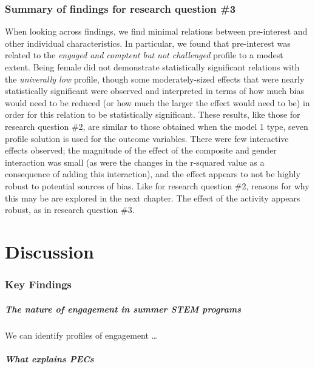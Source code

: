 \documentclass[]{book}
\let\oldparagraph\paragraph
\renewcommand{\paragraph}[1]{\oldparagraph{#1}\mbox{}}
\theoremstyle{definition}
\theoremstyle{definition}
\theoremstyle{definition}
\theoremstyle{remark}
\begin{document}
\subsection{Summary of findings for research question
\#3}\label{summary-of-findings-for-research-question-3}

When looking across findings, we find minimal relations between
pre-interest and other individual characteristics. In particular, we
found that pre-interest was related to the \emph{engaged and comptent
but not challenged} profile to a modest extent. Being female did not
demonstrate statistically significant relations with the
\emph{univerally low} profile, though some moderately-sized effects that
were nearly statistically significant were observed and interpreted in
terms of how much bias would need to be reduced (or how much the larger
the effect would need to be) in order for this relation to be
statistically significant. These results, like those for research
question \#2, are similar to those obtained when the model 1 type, seven
profile solution is used for the outcome variables. There were few
interactive effects observed; the magnitude of the effect of the
composite and gender interaction was small (as were the changes in the
r-squared value as a consequence of adding this interaction), and the
effect appears to not be highly robust to potential sources of bias.
Like for research question \#2, reasons for why this may be are explored
in the next chapter. The effect of the activity appears robust, as in
research question \#3.

\chapter{Discussion}\label{discussion}

\subsection{Key Findings}\label{key-findings}

\paragraph{The nature of engagement in summer STEM
programs}\label{the-nature-of-engagement-in-summer-stem-programs}

We can identify profiles of engagement \ldots{}

\paragraph{What explains PECs}\label{what-explains-pecs}
\end{document}
